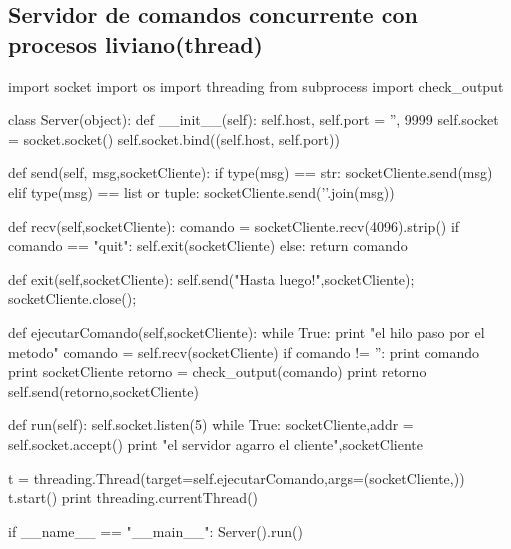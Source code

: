 \documentclass[12pt,a4paper,titlepage]{article}
\begin{document}
     \subsection{Servidor de comandos concurrente con procesos liviano(thread)}
    \begin{python}
import socket
import os
import threading
from subprocess import check_output

class Server(object):
    def __init__(self):
    	self.host, self.port = '', 9999
    	self.socket = socket.socket()
    	self.socket.bind((self.host, self.port))

    def send(self, msg,socketCliente):
    	if type(msg) == str: socketCliente.send(msg)
    	elif type(msg) == list or tuple: socketCliente.send('\n'.join(msg))

    def recv(self,socketCliente):
    	comando = socketCliente.recv(4096).strip()
        if comando == "quit":
            self.exit(socketCliente)
        else: return comando

    def exit(self,socketCliente):
    	self.send("Hasta luego!",socketCliente);
        socketCliente.close(); 
    	
    
    def ejecutarComando(self,socketCliente):
	while True:
	    print "el hilo paso por el metodo"
	    comando = self.recv(socketCliente)
            if comando != '':
	        print comando
		print socketCliente
		retorno = check_output(comando)
		print retorno
		self.send(retorno,socketCliente)
    
    def run(self):
    	self.socket.listen(5)
	while True:
	    socketCliente,addr = self.socket.accept()
	    print "el servidor agarro el cliente",socketCliente
	   
            t = threading.Thread(target=self.ejecutarComando,args=(socketCliente,))
   	    t.start()
	    print threading.currentThread()
            


if __name__ == "__main__":
    Server().run()

    \end{python}
\end{document}
